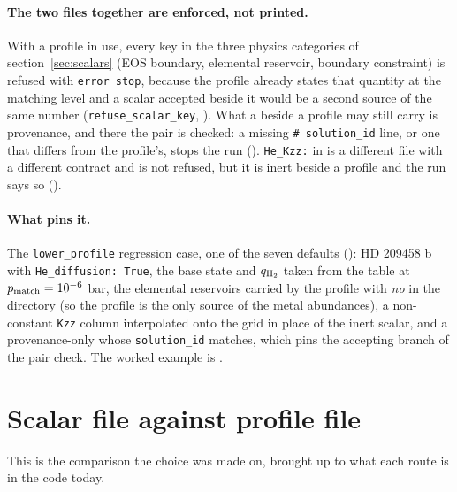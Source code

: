 \documentclass[english,a4paper]{my_memo}
\begin{document}
\paragraph{The two files together are enforced, not printed.} With a
profile in use, every  key in the three physics categories of
section~\ref{sec:scalars} (EOS boundary, elemental reservoir, boundary
constraint) is refused with \verb|error stop|, because the profile
already states that quantity at the matching level and a scalar accepted
beside it would be a second source of the same number
(\verb|refuse_scalar_key|, ). What a
 beside a profile may still carry is provenance, and there
the pair is checked: a missing \verb|# solution_id| line, or one that
differs from the profile's, stops the run
(). \verb|He_Kzz:| in  is a
different file with a different contract and is not refused, but it is inert
beside a profile and the run says so
().

\paragraph{What pins it.} The \verb|lower_profile| regression case, one of
the seven defaults (): HD 209458 b
with \verb|He_diffusion: True|, the base state and $q_{\rm H_2}$ taken from
the table at $p_{\rm match} = 10^{-6}$ bar, the elemental reservoirs
carried by the profile with \emph{no}  in the directory
(so the profile is the only source of the metal abundances), a
non-constant \verb|Kzz| column interpolated onto the grid in place of the
inert scalar, and a provenance-only  whose \verb|solution_id|
matches, which pins the accepting branch of the pair check. The worked
example is .

\section{Scalar file against profile file}
\label{sec:compare}

This is the comparison the choice was made on, brought up to what each route
is in the code today.
\end{document}
